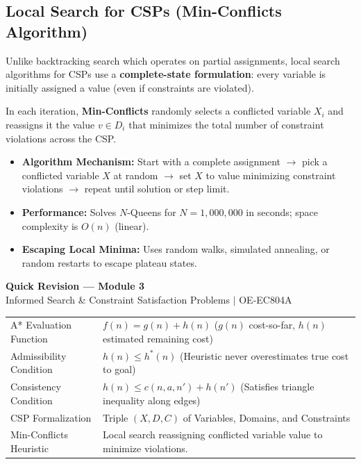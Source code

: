 \documentclass[12pt,a4paper]{article}
\renewcommand{\arraystretch}{1.45}
\begin{document}
\subsection{Local Search for CSPs (Min-Conflicts Algorithm)}
Unlike backtracking search which operates on partial assignments, local search algorithms for CSPs use a \textbf{complete-state formulation}: every variable is initially assigned a value (even if constraints are violated).

\begin{tcolorbox}[defbox, title={Min-Conflicts Heuristic}]
  In each iteration, \textbf{Min-Conflicts} randomly selects a conflicted variable $X_i$ and reassigns it the value $v \in D_i$ that minimizes the total number of constraint violations across the CSP.
\end{tcolorbox}

\begin{itemize}[leftmargin=*, itemsep=3pt]
  \item \textbf{Algorithm Mechanism:} Start with a complete assignment $\to$ pick a conflicted variable $X$ at random $\to$ set $X$ to value minimizing constraint violations $\to$ repeat until solution or step limit.
  \item \textbf{Performance:} Solves $N$-Queens for $N = 1,000,000$ in seconds; space complexity is $O(n)$ (linear).
  \item \textbf{Escaping Local Minima:} Uses random walks, simulated annealing, or random restarts to escape plateau states.
\end{itemize}

\newpage
\begin{center}
  {\large\bfseries\color{myred} Quick Revision --- Module 3}\\[3pt]
  {\small\color{mydark} Informed Search \& Constraint Satisfaction Problems $|$ OE-EC804A}
\end{center}
\noindent{\color{myred}\rule{\linewidth}{1.2pt}}
\vspace{4pt}

\begin{tcolorbox}[formulabox, title={\textbf{Key Concepts and Metrics at a Glance}}]
\renewcommand{\arraystretch}{1.35}
\begin{tabularx}{\linewidth}{B{4.5cm} X}
A* Evaluation Function & $f(n) = g(n) + h(n)$ \quad ($g(n)$ cost-so-far, $h(n)$ estimated remaining cost) \\[4pt]
Admissibility Condition & $h(n) \le h^*(n)$ \quad (Heuristic never overestimates true cost to goal) \\[4pt]
Consistency Condition & $h(n) \le c(n, a, n') + h(n')$ \quad (Satisfies triangle inequality along edges) \\[4pt]
CSP Formalization & Triple $(X, D, C)$ of Variables, Domains, and Constraints \\[4pt]
Min-Conflicts Heuristic & Local search reassigning conflicted variable value to minimize violations. \\
\end{tabularx}
\end{tcolorbox}
\end{document}
